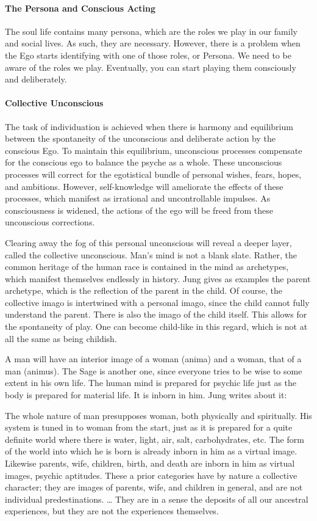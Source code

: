 \paragraph{The Persona and Conscious Acting}
The soul life contains many persona, which are the roles we play in our family and social lives. As such, they are necessary. However, there is a problem when the Ego starts identifying with one of those roles, or Persona. We need to be aware of the roles we play. Eventually, you can start playing them consciously and deliberately.

\paragraph{Collective Unconscious}
The task of individuation is achieved when there is harmony and equilibrium between the spontaneity of the unconscious and deliberate action by the conscious Ego. To maintain this equilibrium, unconscious processes compensate for the conscious ego to balance the psyche as a whole. These unconscious processes will correct for the egotistical bundle of personal wishes, fears, hopes, and ambitions. However, self-knowledge will ameliorate the effects of these processes, which manifest as irrational and uncontrollable impulses. As consciousness is widened, the actions of the ego will be freed from these unconscious corrections.

Clearing away the fog of this personal unconscious will reveal a deeper layer, called the collective unconscious. Man's mind is not a blank slate. Rather, the common heritage of the human race is contained in the mind as archetypes, which manifest themselves endlessly in history. Jung gives as examples the parent archetype, which is the reflection of the parent in the child. Of course, the collective imago is intertwined with a personal imago, since the child cannot fully understand the parent. There is also the imago of the child itself. This allows for the spontaneity of play. One can become child-like in this regard, which is not at all the same as being childish.

A man will have an interior image of a woman (anima) and a woman, that of a man (animus). The Sage is another one, since everyone tries to be wise to some extent in his own life. The human mind is prepared for psychic life just as the body is prepared for material life. It is inborn in him. Jung writes about it:

\begin{quotex}
The whole nature of man presupposes woman, both physically and spiritually. His system is tuned in to woman from the start, just as it is prepared for a quite definite world where there is water, light, air, salt, carbohydrates, etc. The form of the world into which he is born is already inborn in him as a virtual image. Likewise parents, wife, children, birth, and death are inborn in him as virtual images, psychic aptitudes. These a prior categories have by nature a collective character; they are images of parents, wife, and children in general, and are not individual predestinations. … They are in a sense the deposits of all our ancestral experiences, but they are not the experiences themselves. 

\end{quotex}
